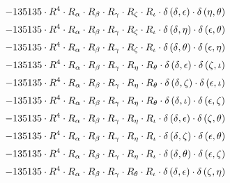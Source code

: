 \begin{subequations}
\begin{gather}
 \\[0.2em] \notag 		 - 135135 \cdot R^{4} \cdot R_{\alpha{}} \cdot R_{\beta{}} \cdot R_{\gamma{}} \cdot R_{\zeta{}} \cdot R_{\iota{}} \cdot \delta{}\left(\delta{}, \epsilon{}\right) \cdot \delta{}\left(\eta{}, \theta{}\right) 
 \\[0.2em] \notag 		 - 135135 \cdot R^{4} \cdot R_{\alpha{}} \cdot R_{\beta{}} \cdot R_{\gamma{}} \cdot R_{\zeta{}} \cdot R_{\iota{}} \cdot \delta{}\left(\delta{}, \eta{}\right) \cdot \delta{}\left(\epsilon{}, \theta{}\right) 
 \\[0.2em] \notag 		 - 135135 \cdot R^{4} \cdot R_{\alpha{}} \cdot R_{\beta{}} \cdot R_{\gamma{}} \cdot R_{\zeta{}} \cdot R_{\iota{}} \cdot \delta{}\left(\delta{}, \theta{}\right) \cdot \delta{}\left(\epsilon{}, \eta{}\right) 
 \\[0.2em] \notag 		 - 135135 \cdot R^{4} \cdot R_{\alpha{}} \cdot R_{\beta{}} \cdot R_{\gamma{}} \cdot R_{\eta{}} \cdot R_{\theta{}} \cdot \delta{}\left(\delta{}, \epsilon{}\right) \cdot \delta{}\left(\zeta{}, \iota{}\right) 
 \\[0.2em] \notag 		 - 135135 \cdot R^{4} \cdot R_{\alpha{}} \cdot R_{\beta{}} \cdot R_{\gamma{}} \cdot R_{\eta{}} \cdot R_{\theta{}} \cdot \delta{}\left(\delta{}, \zeta{}\right) \cdot \delta{}\left(\epsilon{}, \iota{}\right) 
 \\[0.2em] \notag 		 - 135135 \cdot R^{4} \cdot R_{\alpha{}} \cdot R_{\beta{}} \cdot R_{\gamma{}} \cdot R_{\eta{}} \cdot R_{\theta{}} \cdot \delta{}\left(\delta{}, \iota{}\right) \cdot \delta{}\left(\epsilon{}, \zeta{}\right) 
 \\[0.2em] \notag 		 - 135135 \cdot R^{4} \cdot R_{\alpha{}} \cdot R_{\beta{}} \cdot R_{\gamma{}} \cdot R_{\eta{}} \cdot R_{\iota{}} \cdot \delta{}\left(\delta{}, \epsilon{}\right) \cdot \delta{}\left(\zeta{}, \theta{}\right) 
 \\[0.2em] \notag 		 - 135135 \cdot R^{4} \cdot R_{\alpha{}} \cdot R_{\beta{}} \cdot R_{\gamma{}} \cdot R_{\eta{}} \cdot R_{\iota{}} \cdot \delta{}\left(\delta{}, \zeta{}\right) \cdot \delta{}\left(\epsilon{}, \theta{}\right) 
 \\[0.2em] \notag 		 - 135135 \cdot R^{4} \cdot R_{\alpha{}} \cdot R_{\beta{}} \cdot R_{\gamma{}} \cdot R_{\eta{}} \cdot R_{\iota{}} \cdot \delta{}\left(\delta{}, \theta{}\right) \cdot \delta{}\left(\epsilon{}, \zeta{}\right) 
 \\[0.2em] \notag 		 - 135135 \cdot R^{4} \cdot R_{\alpha{}} \cdot R_{\beta{}} \cdot R_{\gamma{}} \cdot R_{\theta{}} \cdot R_{\iota{}} \cdot \delta{}\left(\delta{}, \epsilon{}\right) \cdot \delta{}\left(\zeta{}, \eta{}\right) 

\end{gather}
\end{subequations}
